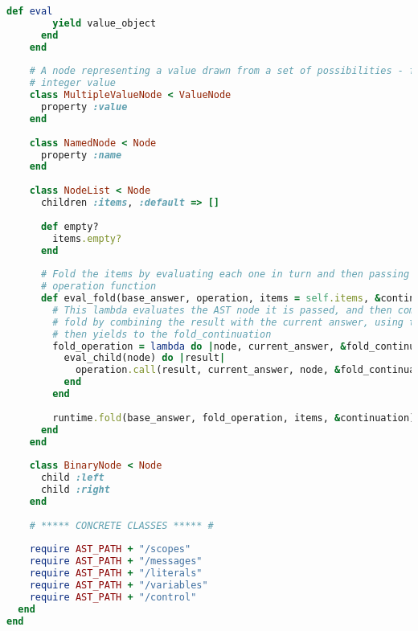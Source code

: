 \begin{lstlisting}[title={\small\ttfamily\bfseries ast/ast.rb},language=Ruby]
      def eval
        yield value_object
      end
    end
    
    # A node representing a value drawn from a set of possibilities - for example a string or
    # integer value
    class MultipleValueNode < ValueNode
      property :value
    end
    
    class NamedNode < Node
      property :name
    end
    
    class NodeList < Node
      children :items, :default => []
      
      def empty?
        items.empty?
      end
      
      # Fold the items by evaluating each one in turn and then passing the evaluated object to an
      # operation function
      def eval_fold(base_answer, operation, items = self.items, &continuation)
        # This lambda evaluates the AST node it is passed, and then computes the next answer for the
        # fold by combining the result with the current answer, using the operation provided, which
        # then yields to the fold_continuation
        fold_operation = lambda do |node, current_answer, &fold_continuation|
          eval_child(node) do |result|
            operation.call(result, current_answer, node, &fold_continuation)
          end
        end
        
        runtime.fold(base_answer, fold_operation, items, &continuation)
      end
    end
    
    class BinaryNode < Node
      child :left
      child :right
    end
    
    # ***** CONCRETE CLASSES ***** #
    
    require AST_PATH + "/scopes"
    require AST_PATH + "/messages"
    require AST_PATH + "/literals"
    require AST_PATH + "/variables"
    require AST_PATH + "/control"
  end
end

\end{lstlisting}
